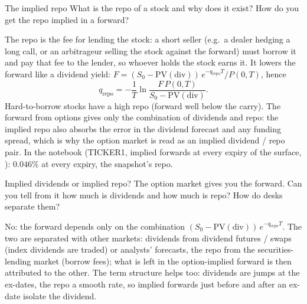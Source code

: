 \begin{question}{\Theory \Practice {}}{The implied repo}
What is the repo of a stock and why does it exist? How do you get the repo implied in a forward?
\end{question}
\begin{answer}
The repo is the fee for lending the stock: a short seller (e.g.\ a dealer hedging a long call, or an arbitrageur selling
the stock against the forward) must borrow it and pay that fee to the lender, so whoever holds the stock earns it. It
lowers the forward like a dividend yield: $F = (S_0 - \mathrm{PV}(\text{div}))\,e^{-q_{\text{repo}}T}/P(0,T)$, hence
\[
  q_{\text{repo}} = -\frac{1}{T}\ln\frac{F\,P(0,T)}{S_0 - \mathrm{PV}(\text{div})}.
\]
Hard-to-borrow stocks have a high repo (forward well below the carry). The forward from options gives only the
combination of dividends and repo: the implied repo also absorbs the error in the dividend forecast and any funding
spread, which is why the option market is read as an implied dividend / repo pair. In the notebook (TICKER1, implied
forwards at every expiry of the surface, ): $0.046\%$ at every expiry, the snapshot's repo.
\end{answer}

\begin{question}{\Theory {}}{Implied dividends or implied repo?}
The option market gives you the forward. Can you tell from it how much is dividends and how much is repo? How do
desks separate them?
\end{question}
\begin{answer}
No: the forward depends only on the combination $(S_0 - \mathrm{PV}(\text{div}))\,e^{-q_{\text{repo}}T}$. The two are
separated with other markets: dividends from dividend futures / swaps (index dividends are traded) or analysts'
forecasts, the repo from the securities-lending market (borrow fees); what is left in the option-implied forward is
then attributed to the other. The term structure helps too: dividends are jumps at the ex-dates, the repo a smooth
rate, so implied forwards just before and after an ex-date isolate the dividend.
\end{answer}

